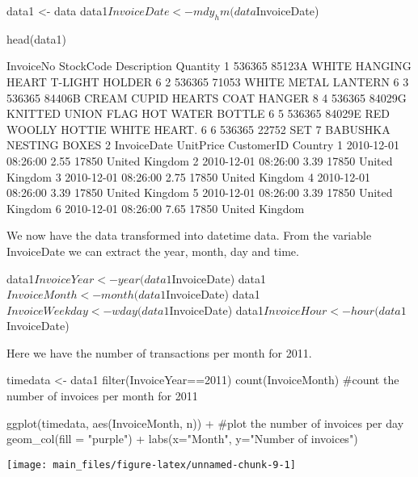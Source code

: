 \begin{Schunk}
\begin{Sinput}
data1 <- data
data1$InvoiceDate <- mdy_hm(data$InvoiceDate) 


head(data1)
\end{Sinput}
\begin{Soutput}
  InvoiceNo StockCode                         Description Quantity
1    536365    85123A  WHITE HANGING HEART T-LIGHT HOLDER        6
2    536365     71053                 WHITE METAL LANTERN        6
3    536365    84406B      CREAM CUPID HEARTS COAT HANGER        8
4    536365    84029G KNITTED UNION FLAG HOT WATER BOTTLE        6
5    536365    84029E      RED WOOLLY HOTTIE WHITE HEART.        6
6    536365     22752        SET 7 BABUSHKA NESTING BOXES        2
          InvoiceDate UnitPrice CustomerID        Country
1 2010-12-01 08:26:00      2.55      17850 United Kingdom
2 2010-12-01 08:26:00      3.39      17850 United Kingdom
3 2010-12-01 08:26:00      2.75      17850 United Kingdom
4 2010-12-01 08:26:00      3.39      17850 United Kingdom
5 2010-12-01 08:26:00      3.39      17850 United Kingdom
6 2010-12-01 08:26:00      7.65      17850 United Kingdom
\end{Soutput}
\end{Schunk}

We now have the data transformed into datetime data. From the variable
InvoiceDate we can extract the year, month, day and time.

\begin{Schunk}
\begin{Sinput}
data1$InvoiceYear <- year(data1$InvoiceDate)
data1$InvoiceMonth <- month(data1$InvoiceDate)
data1$InvoiceWeekday <- wday(data1$InvoiceDate)
data1$InvoiceHour <- hour(data1$InvoiceDate)
\end{Sinput}
\end{Schunk}

Here we have the number of transactions per month for 2011.

\begin{Schunk}
\begin{Sinput}
timedata <- data1 %>% 
  filter(InvoiceYear==2011) %>% 
  count(InvoiceMonth)  #count the number of invoices per month for 2011

ggplot(timedata, aes(InvoiceMonth, n)) +  #plot the number of invoices per day               
  geom_col(fill = "purple") +
  labs(x="Month", y="Number of invoices")
\end{Sinput}


\begin{center}\texttt{[image: main\_files/figure-latex/unnamed-chunk-9-1]} \end{center}

\end{Schunk}

